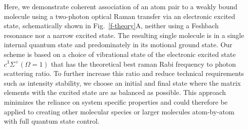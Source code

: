 \documentclass[aps,prl,twocolumn,superscriptaddress]{revtex4-1}
\begin{document}
Here, we demonstrate coherent association of an atom pair to a weakly bound molecule using a two-photon optical Raman transfer via an electronic excited state, schematically shown in Fig.~\ref{f-theory}A, neither using a Feshbach resonance nor a narrow excited state. The resulting single molecule is in a single internal quantum state and predominately in its motional ground state.  Our scheme is based on a choice of vibrational state of the electronic excited state $c^3\Sigma^+(\Omega = 1)$ that has the theoretical best raman Rabi frequency to photon scattering ratio. To further increase this ratio and reduce technical requirements such as intensity stability, we choose an initial and final state where the matrix elements with the excited state are as balanced as possible. This approach minimizes the reliance on system specific properties and could therefore be applied to creating other molecular species or larger molecules atom-by-atom with full quantum state control.





\end{document}
